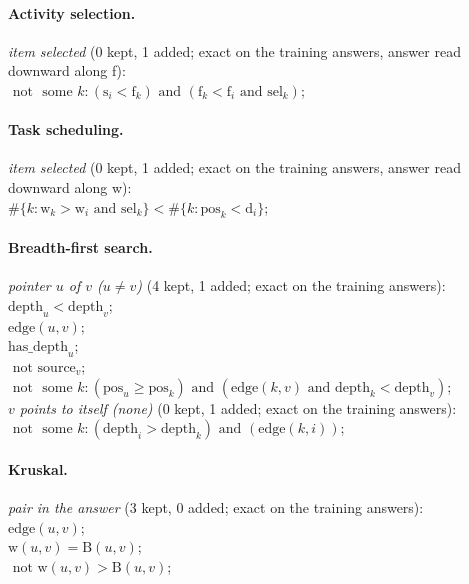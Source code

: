 \documentclass[10pt]{article}
\begin{document}
{\paragraph{Activity selection.}
\emph{item selected} (0 kept, 1 added; exact on the training answers, answer read downward along f):\\
\quad $\text{ not } \text{ some } k: (\mathrm{s}_{i} < \mathrm{f}_{k}) \text{ and } (\mathrm{f}_{k} < \mathrm{f}_{i} \text{ and } \mathrm{sel}_{k})$;

\paragraph{Task scheduling.}
\emph{item selected} (0 kept, 1 added; exact on the training answers, answer read downward along w):\\
\quad $\#\{k: \mathrm{w}_{k} > \mathrm{w}_{i} \text{ and } \mathrm{sel}_{k}\} < \#\{k: \mathrm{pos}_{k} < \mathrm{d}_{i}\}$;

\paragraph{Breadth-first search.}
\emph{pointer $u$ of $v$ ($u \neq v$)} (4 kept, 1 added; exact on the training answers):\\
\quad $\mathrm{depth}_{u} < \mathrm{depth}_{v}$;\\
\quad $\mathrm{edge}(u, v)$;\\
\quad $\mathrm{has\_depth}_{u}$;\\
\quad $\text{ not } \mathrm{source}_{v}$;\\
\quad $\text{ not } \text{ some } k: (\mathrm{pos}_{u}  \geq  \mathrm{pos}_{k}) \text{ and } (\mathrm{edge}(k, v) \text{ and } \mathrm{depth}_{k} < \mathrm{depth}_{v})$;\\
\emph{$v$ points to itself (none)} (0 kept, 1 added; exact on the training answers):\\
\quad $\text{ not } \text{ some } k: (\mathrm{depth}_{i} > \mathrm{depth}_{k}) \text{ and } (\mathrm{edge}(k, i))$;

\paragraph{Kruskal.}
\emph{pair in the answer} (3 kept, 0 added; exact on the training answers):\\
\quad $\mathrm{edge}(u, v)$;\\
\quad $\mathrm{w}(u, v) = \mathrm{B}(u, v)$;\\
\quad $\text{ not } \mathrm{w}(u, v) > \mathrm{B}(u, v)$;

}
\end{document}
